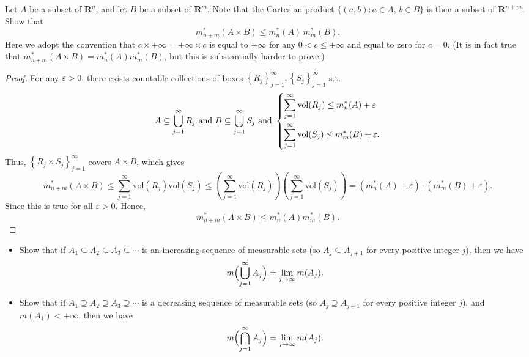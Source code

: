 \begin{problem}

Let $A$ be a subset of $\mathbf{R}^n$, and let $B$ be a subset of $\mathbf{R}^m$.
Note that the Cartesian product $\{(a,b): a\in A,\, b\in B\}$ is then a subset of
$\mathbf{R}^{n+m}$. Show that
$$
m^*_{n+m}(A\times B)\le m^*_n(A)\,m^*_m(B).
$$
Here we adopt the convention that $c\times +\infty=+\infty\times c$ is equal to $+\infty$
for any $0<c\le +\infty$ and equal to zero for $c=0$.
(It is in fact true that $m^*_{n+m}(A\times B)=m^*_n(A)m^*_m(B)$, but this is
substantially harder to prove.)

\end{problem}

\begin{proof}
    For any \(\varepsilon > 0\), there exists countable collections of boxes \(\left\{ R_j \right\}_{j=1}^{\infty}, \left\{ S_j \right\}_{j=1}^{\infty}    \) s.t. 
    \[
        A \subseteq \bigcup_{j=1}^{\infty} R_j \text{ and } B \subseteq \bigcup_{j=1}^{\infty} S_j \text{ and } \begin{dcases}
            \sum_{j=1}^{\infty} \mathrm{vol} (R_j) \le m_n^*(A) + \varepsilon \\
            \sum_{j=1}^{\infty} \mathrm{vol} (S_j) \le m_m^*(B) + \varepsilon.    
        \end{dcases}    
    \]
    Thus, \(\left\{ R_j \times S_j \right\}_{j=1}^{\infty} \) covers \(A \times B\), which gives 
    \[
        m_{n + m}^*(A \times B) \le \sum_{j=1}^{\infty } \mathrm{vol} (R_j) \mathrm{vol}(S_j) \le \left( \sum_{j=1}^{\infty} \mathrm{vol} (R_j)   \right) \left( \sum_{j=1}^{\infty} \mathrm{vol} (S_j)   \right) = \left( m_n^*(A) + \varepsilon \right) \cdot \left( m_m^*(B) + \varepsilon \right).       
    \]  
    Since this is true for all \(\varepsilon > 0\). Hence,
    \[
        m_{n + m}^* (A \times B) \le m_n^*(A) m_m^*(B).
    \] 
\end{proof}

\begin{problem}


\begin{itemize}
\item[(a)] Show that if $A_1\subseteq A_2\subseteq A_3\subseteq\cdots$ is an increasing sequence
of measurable sets (so $A_j\subseteq A_{j+1}$ for every positive integer $j$), then we have
$$
m\Bigl(\bigcup_{j=1}^\infty A_j\Bigr)=\lim_{j\to\infty} m(A_j).
$$
\item[(b)] Show that if $A_1\supseteq A_2\supseteq A_3\supseteq\cdots$ is a decreasing sequence
of measurable sets (so $A_j\supseteq A_{j+1}$ for every positive integer $j$), and $m(A_1)<+\infty$,
then we have
$$
m\Bigl(\bigcap_{j=1}^\infty A_j\Bigr)=\lim_{j\to\infty} m(A_j).
$$
\end{itemize}

\end{problem}

